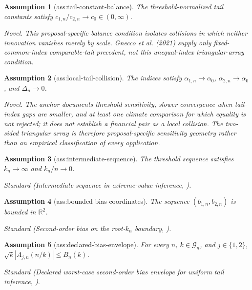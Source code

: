 \documentclass{article}
\newtheorem{assumption}{Assumption}
\begin{document}
\begin{assumption}[ass:tail-constant-balance]\label{ass:tail-constant-balance}
The threshold-normalized tail constants satisfy \(c_{1,n}/c_{2,n}\to c_0\in(0,\infty)\).
\par\smallskip\noindent\emph{Novel.} This proposal-specific balance condition isolates collisions in which neither innovation vanishes merely by scale. Gnecco et al. (2021) supply only fixed-common-index comparable-tail precedent, not this unequal-index triangular-array condition.
\end{assumption}

\begin{assumption}[ass:local-tail-collision]\label{ass:local-tail-collision}
The indices satisfy \(\alpha_{1,n}\to\alpha_0\), \(\alpha_{2,n}\to\alpha_0\), and \(\Delta_n\to0\).
\par\smallskip\noindent\emph{Novel.} The anchor documents threshold sensitivity, slower convergence when tail-index gaps are smaller, and at least one climate comparison for which equality is not rejected; it does not establish a financial pair as a local collision. The two-sided triangular array is therefore proposal-specific sensitivity geometry rather than an empirical classification of every application.
\end{assumption}

\begin{assumption}[ass:intermediate-sequence]\label{ass:intermediate-sequence}
The threshold sequence satisfies \(k_n\to\infty\) and \(k_n/n\to0\).
\par\smallskip\noindent\emph{Standard} (Intermediate sequence in extreme-value inference, \cite{deHaanFerreira2006}).
\end{assumption}

\begin{assumption}[ass:bounded-bias-coordinates]\label{ass:bounded-bias-coordinates}
The sequence \((b_{1,n},b_{2,n})\) is bounded in \(\mathbb R^2\).
\par\smallskip\noindent\emph{Standard} (Second-order bias on the root-\(k_n\) boundary, \cite{Drees1998}).
\end{assumption}

\begin{assumption}[ass:declared-bias-envelope]\label{ass:declared-bias-envelope}
For every \(n\), \(k\in\mathcal G_n\), and \(j\in\{1,2\}\), \(\sqrt{k}|A_{j,n}(n/k)|\leq B_n(k)\).
\par\smallskip\noindent\emph{Standard} (Declared worst-case second-order bias envelope for uniform tail inference, \cite{SasakiWang2024}).
\end{assumption}
\end{document}
